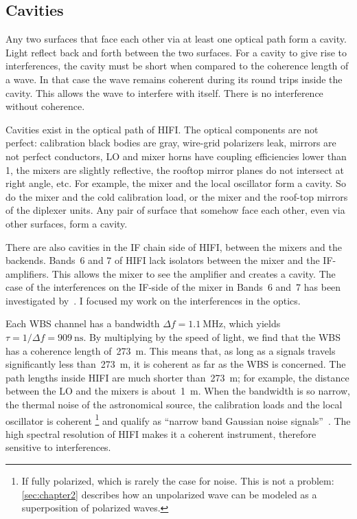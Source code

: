 
\subsection{Cavities}

Any two surfaces that face each other via at least one optical path form a cavity.
Light reflect back and forth between the two surfaces.
For a cavity to give rise to interferences, the cavity must be short when compared to the coherence length of a wave.
In that case the wave remains coherent during its round trips inside the cavity.
This allows the wave to interfere with itself.
There is no interference without coherence.

Cavities exist in the optical path of HIFI.
The optical components are not perfect: calibration black bodies are gray, wire-grid polarizers leak, mirrors are not perfect conductors, LO and mixer horns have coupling efficiencies lower than 1, the mixers are slightly reflective, the rooftop mirror planes do not intersect at right angle, etc.
For example, the mixer and the local oscillator form a cavity.
So do the mixer and the cold calibration load, or the mixer and the roof-top mirrors of the diplexer units.
Any pair of surface that somehow face each other, even via other surfaces, form a cavity.

There are also cavities in the IF chain side of HIFI, between the mixers and the backends.
Bands~6 and 7 of HIFI lack isolators between the mixer and the IF-amplifiers.
This allows the mixer to see the amplifier and creates a cavity.
The case of the interferences on the IF-side of the mixer in Bands~6 and~7 has been investigated by~\textcite{higgins2011}.
I focused my work on the interferences in the optics.

Each WBS channel has a bandwidth $\Delta f = \SI{1.1}{\mega\hertz}$,
which yields $\tau = 1 / \Delta f = \SI{909}{\nano\second}$.
By multiplying by the speed of light, we find that the WBS has a coherence length of~\SI{273}{\meter}.
This means that, as long as a signals travels significantly less than~\SI{273}{\meter}, it is coherent as far as the WBS is concerned.
The path lengths inside HIFI are much shorter than~\SI{273}{\meter};
for example, the distance between the LO and the mixers is about~\SI{1}{\meter}.
When the bandwidth is so narrow, the thermal noise of the astronomical source, the calibration loads and the local oscillator is coherent%
\footnote{If fully polarized, which is rarely the case for noise.  This is not a problem: \cref{sec:chapter2} describes how an unpolarized wave can be modeled as a superposition of polarized waves.}
 and qualify as ``narrow band Gaussian noise signals''~\parencite{siegman1986lasers}.
The high spectral resolution of HIFI makes it a coherent instrument, therefore sensitive to interferences.

